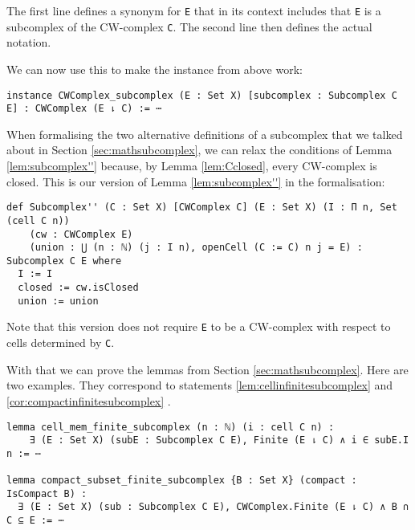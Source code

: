 The first line defines a synonym for \lstinline{E} that in its context includes that \lstinline{E} is a subcomplex of the CW-complex \lstinline{C}. 
The second line then defines the actual notation. 

We can now use this to make the instance from above work: 
\href{https://github.com/scholzhannah/CWComplexes/blob/7be4872a05b534011cc969eb5b80a4b7f0bf57e2/CWcomplexes/subcomplex.lean#L117-L174}{\faExternalLink}

\begin{lstlisting}
instance CWComplex_subcomplex (E : Set X) [subcomplex : Subcomplex C E] : CWComplex (E ⇂ C) := ⋯
\end{lstlisting}

When formalising the two alternative definitions of a subcomplex that we talked about in Section \ref{sec:mathsubcomplex}, we can relax the conditions of Lemma \ref{lem:subcomplex''} because, by Lemma \ref{lem:Cclosed}, every CW-complex is closed. 
This is our version of Lemma \ref{lem:subcomplex''} in the formalisation: 
\href{https://github.com/scholzhannah/CWComplexes/blob/7be4872a05b534011cc969eb5b80a4b7f0bf57e2/CWcomplexes/subcomplex.lean#L82-L89}{\faExternalLink}

\begin{lstlisting}
def Subcomplex'' (C : Set X) [CWComplex C] (E : Set X) (I : Π n, Set (cell C n))
    (cw : CWComplex E)
    (union : ⋃ (n : ℕ) (j : I n), openCell (C := C) n j = E) : Subcomplex C E where
  I := I
  closed := cw.isClosed
  union := union
\end{lstlisting}

Note that this version does not require \lstinline{E} to be a CW-complex with respect to cells determined by \lstinline{C}.

With that we can prove the lemmas from Section \ref{sec:mathsubcomplex}. 
Here are two examples.
They correspond to statements \ref{lem:cellinfinitesubcomplex}
\href{https://github.com/scholzhannah/CWComplexes/blob/7be4872a05b534011cc969eb5b80a4b7f0bf57e2/CWcomplexes/subcomplex.lean#L336-L364}{\faExternalLink}
and \ref{cor:compactinfinitesubcomplex}
\href{https://github.com/scholzhannah/CWComplexes/blob/7be4872a05b534011cc969eb5b80a4b7f0bf57e2/CWcomplexes/subcomplex.lean#L386-L397}{\faExternalLink}.

\begin{lstlisting}
lemma cell_mem_finite_subcomplex (n : ℕ) (i : cell C n) :
    ∃ (E : Set X) (subE : Subcomplex C E), Finite (E ⇂ C) ∧ i ∈ subE.I n := ⋯

lemma compact_subset_finite_subcomplex {B : Set X} (compact : IsCompact B) :
  ∃ (E : Set X) (sub : Subcomplex C E), CWComplex.Finite (E ⇂ C) ∧ B ∩ C ⊆ E := ⋯
\end{lstlisting}